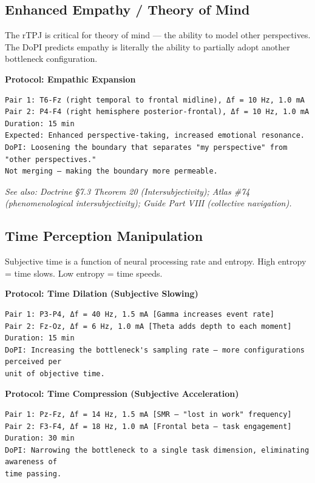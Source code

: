 \subsection*{Enhanced Empathy / Theory of Mind}


The rTPJ is critical for theory of mind — the ability to model other perspectives. The DoPI predicts empathy is literally the ability to partially adopt another bottleneck configuration.


\textbf{Protocol: Empathic Expansion}

\begin{verbatim}
Pair 1: T6-Fz (right temporal to frontal midline), Δf = 10 Hz, 1.0 mA
Pair 2: P4-F4 (right hemisphere posterior-frontal), Δf = 10 Hz, 1.0 mA
Duration: 15 min
Expected: Enhanced perspective-taking, increased emotional resonance.
DoPI: Loosening the boundary that separates "my perspective" from "other perspectives." 
Not merging — making the boundary more permeable.
\end{verbatim}


\textit{See also: Doctrine §7.3 Theorem 20 (Intersubjectivity); Atlas \#74 (phenomenological intersubjectivity); Guide Part VIII (collective navigation).}


\subsection*{Time Perception Manipulation}


Subjective time is a function of neural processing rate and entropy. High entropy = time slows. Low entropy = time speeds.


\textbf{Protocol: Time Dilation (Subjective Slowing)}

\begin{verbatim}
Pair 1: P3-P4, Δf = 40 Hz, 1.5 mA [Gamma increases event rate]
Pair 2: Fz-Oz, Δf = 6 Hz, 1.0 mA [Theta adds depth to each moment]
Duration: 15 min
DoPI: Increasing the bottleneck's sampling rate — more configurations perceived per 
unit of objective time.
\end{verbatim}


\textbf{Protocol: Time Compression (Subjective Acceleration)}

\begin{verbatim}
Pair 1: Pz-Fz, Δf = 14 Hz, 1.5 mA [SMR — "lost in work" frequency]
Pair 2: F3-F4, Δf = 18 Hz, 1.0 mA [Frontal beta — task engagement]
Duration: 30 min
DoPI: Narrowing the bottleneck to a single task dimension, eliminating awareness of 
time passing.
\end{verbatim}


